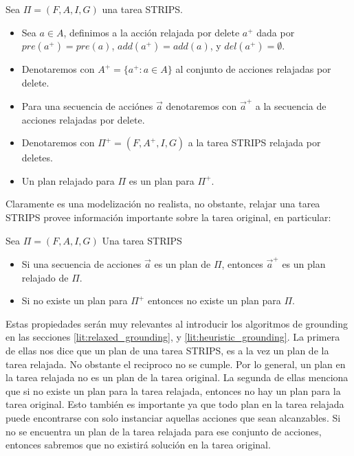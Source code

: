 \begin{mydef}
    Sea $\Pi = (F, A, I, G)$ una tarea STRIPS.
    \begin{itemize}
        \item Sea $a \in A$, definimos a la acción relajada por delete $a^{+}$
        dada por $pre(a^{+}) = pre(a)$, $add(a^{+}) = add(a)$, y $del(a^{+}) =
        \emptyset$.

        \item Denotaremos con $A^{+} = \{a^{+} : a \in A\}$ al conjunto de
        acciones relajadas por delete.

        \item Para una secuencia de acciónes $\vec{a}$ denotaremos con
        $\vec{a}^{+}$ a la secuencia de acciones relajadas por delete.

        \item Denotaremos con $\Pi^{+} = (F, A^{+}, I, G)$ a la tarea STRIPS
        relajada por deletes.

        \item Un plan relajado para $\Pi$ es un plan para $\Pi^{+}$.
    \end{itemize}
\end{mydef}

Claramente es una modelización no realista, no obstante, relajar una tarea STRIPS provee información importante sobre la tarea original, en particular:

\begin{lemma}
\label{lit:delete_relaxed_property}
Sea $\Pi = (F, A, I, G)$ Una tarea STRIPS
\begin{itemize}
    \item Si una secuencia de acciones $\vec{a}$ es un plan de $\Pi$, entonces $\vec{a}^{+}$ es un plan relajado de $\Pi$.
    \item Si no existe un plan para $\Pi^{+}$ entonces no existe un plan para $\Pi$.
\end{itemize}
\end{lemma}

Estas propiedades serán muy relevantes al introducir los algoritmos de grounding en las secciones \ref{lit:relaxed_grounding}, y \ref{lit:heuristic_grounding}. La primera de ellas nos dice que un plan de una tarea STRIPS, es a la vez un plan de la tarea relajada. No obstante el reciproco no se cumple. Por lo general, un plan en la tarea relajada no es un plan de la tarea original. La segunda de ellas menciona que si no existe un plan para la tarea relajada, entonces no hay un plan para la tarea original. Esto también es importante ya que todo plan en la tarea relajada puede encontrarse con solo instanciar aquellas acciones que sean alcanzables. Si no se encuentra un plan de la tarea relajada para ese conjunto de acciones, entonces sabremos que no existirá solución en la tarea original.

